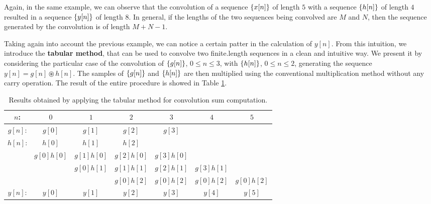 \documentclass[../../main/main.tex]{subfiles}
\begin{document}
Again, in the same example, we can observe that the convolution of a sequence \( \qty{x[n]} \) of length \( 5 \) with a sequence \( \qty{h[n]} \) of length \( 4 \) resulted in a sequence \( \qty{y[n]} \) of length \( 8 \).
In general, if the lengths of the two sequences being convolved are \( M \) and \( N \), then the sequence generated by the convolution is of length \( M + N - 1 \).

\medskip
{}
Taking again into account the previous example, we can notice a certain patter in the calculation of \( y[n] \). From this intuition, we introduce the \textbf{tabular method}, that can be used to convolve two finite.length sequences in a clean and intuitive way.
We present it by considering the particular case of the convolution of \( \qty{g[n]} \), \( 0 \le n \le 3 \), with \( \qty{h[n]} \), \( 0 \le n \le 2 \), generating the sequence \( y[n] = g[n] \circledast h[n] \).
The samples of \( \qty{g[n]} \) and \( \qty{h[n]} \) are then multiplied using the conventional multiplication method without any carry operation. The result of the entire procedure is showed in Table \ref{tab:L05_S31_1}.

\begin{table}[!h]
    \centering
    \begin{tabular}{ccccccc}
        \toprule
        \( n \): &   \( 0 \) &   \( 1 \) &   \( 2 \) &   \( 3 \) &   \( 4 \) &   \( 5 \) \\
        \midrule
        \( g[n] \): &   \( g[0] \)  &   \( g[1] \)  &   \( g[2] \)  &   \( g[3] \)  &   &   \\
        \( h[n] \): &   \( h[0] \)  &   \( h[1] \)  &   \( h[2] \)  &               &   &   \\
        \midrule
            &   \( g[0]h[0] \)  &   \( g[1]h[0] \)  &   \( g[2]h[0] \)  &   \( g[3]h[0] \)  &   &   \\
            &   &   \( g[0]h[1] \)  &   \( g[1]h[1] \)  &   \( g[2]h[1] \)  &   \( g[3]h[1] \)  &   \\
            &   &   &   \( g[0]h[2] \)  &   \( g[0]h[2] \)  &   \( g[0]h[2] \)  &   \( g[0]h[2] \)  \\
        \midrule
        \( y[n] \): &   \( y[0] \)  &   \( y[1] \)  &   \( y[2] \)  &   \( y[3] \)  &   \( y[4] \)  &   \( y[5] \)  \\
        \bottomrule
    \end{tabular}
    \caption{\label{tab:L05_S31_1} Results obtained by applying the tabular method for convolution sum computation.}
\end{table}
\end{document}
